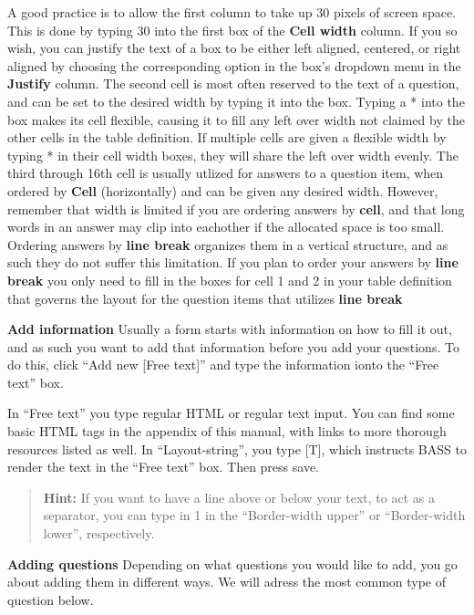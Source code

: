 \documentclass[
]{book}
\begin{document}
A good practice is to allow the first column to take up 30 pixels of screen space. This is done by typing 30 into the first box of the \textbf{Cell width} column. If you so wish, you can justify the text of a box to be either left aligned, centered, or right aligned by choosing the corresponding option in the box's dropdown menu in the \textbf{Justify} column.
The second cell is most often reserved to the text of a question, and can be set to the desired width by typing it into the box.
Typing a * into the box makes its cell flexible, causing it to fill any left over width not claimed by the other cells in the table definition. If multiple cells are given a flexible width by typing * in their cell width boxes, they will share the left over width evenly.
The third through 16th cell is usually utlized for answers to a question item, when ordered by \textbf{Cell} (horizontally) and can be given any desired width. However, remember that width is limited if you are ordering answers by \textbf{cell}, and that long words in an answer may clip into eachother if the allocated space is too small.
Ordering answers by \textbf{line break} organizes them in a vertical structure, and as such they do not suffer this limitation. If you plan to order your answers by \textbf{line break} you only need to fill in the boxes for cell 1 and 2 in your table definition that governs the layout for the question items that utilizes \textbf{line break}

\textbf{Add information}
Usually a form starts with information on how to fill it out, and as such you want to add that information before you add your questions. To do this, click ``Add new {[}Free text{]}'' and type the information ionto the ``Free text'' box.

In ``Free text'' you type regular HTML or regular text input. You can find some basic HTML tags in the appendix of this manual, with links to more thorough resources listed as well.
In ``Layout-string'', you type {[}T{]}, which instructs BASS to render the text in the ``Free text'' box. Then press save.

\begin{quote}
\textbf{Hint:} If you want to have a line above or below your text, to act as a separator, you can type in 1 in the ``Border-width upper'' or ``Border-width lower'', respectively.
\end{quote}

\textbf{Adding questions}
Depending on what questions you would like to add, you go about adding them in different ways. We will adress the most common type of question below.
\end{document}

